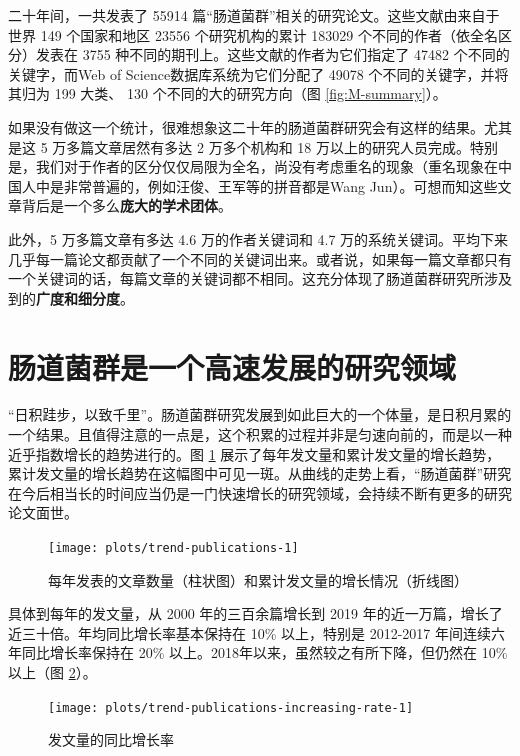 \documentclass[]{ctexbook}
\begin{document}
二十年间，一共发表了 55914 篇``肠道菌群''相关的研究论文。这些文献由来自于世界 149 个国家和地区 23556 个研究机构的累计 183029 个不同的作者（依全名区分）发表在 3755 种不同的期刊上。这些文献的作者为它们指定了 47482 个不同的关键字，而Web of Science数据库系统为它们分配了 49078 个不同的关键字，并将其归为 199 大类、 130 个不同的大的研究方向（图 \ref{fig:M-summary}）。

如果没有做这一个统计，很难想象这二十年的肠道菌群研究会有这样的结果。尤其是这 5 万多篇文章居然有多达 2 万多个机构和 18 万以上的研究人员完成。特别是，我们对于作者的区分仅仅局限为全名，尚没有考虑重名的现象（重名现象在中国人中是非常普遍的，例如汪俊、王军等的拼音都是Wang Jun）。可想而知这些文章背后是一个多么\textbf{庞大的学术团体}。

此外，5 万多篇文章有多达 4.6 万的作者关键词和 4.7 万的系统关键词。平均下来几乎每一篇论文都贡献了一个不同的关键词出来。或者说，如果每一篇文章都只有一个关键词的话，每篇文章的关键词都不相同。这充分体现了肠道菌群研究所涉及到的\textbf{广度和细分度}。

\hypertarget{ux80a0ux9053ux83ccux7fa4ux662fux4e00ux4e2aux9ad8ux901fux53d1ux5c55ux7684ux7814ux7a76ux9886ux57df}{%
\section{肠道菌群是一个高速发展的研究领域}\label{ux80a0ux9053ux83ccux7fa4ux662fux4e00ux4e2aux9ad8ux901fux53d1ux5c55ux7684ux7814ux7a76ux9886ux57df}}

``日积跬步，以致千里''。肠道菌群研究发展到如此巨大的一个体量，是日积月累的一个结果。且值得注意的一点是，这个积累的过程并非是匀速向前的，而是以一种近乎指数增长的趋势进行的。图 \ref{fig:trend-publications} 展示了每年发文量和累计发文量的增长趋势，累计发文量的增长趋势在这幅图中可见一斑。从曲线的走势上看，``肠道菌群''研究在今后相当长的时间应当仍是一门快速增长的研究领域，会持续不断有更多的研究论文面世。

\begin{figure}
\texttt{[image: plots/trend-publications-1]} \caption{每年发表的文章数量（柱状图）和累计发文量的增长情况（折线图）}\label{fig:trend-publications}
\end{figure}

具体到每年的发文量，从 2000 年的三百余篇增长到 2019 年的近一万篇，增长了近三十倍。年均同比增长率基本保持在 10\% 以上，特别是 2012-2017 年间连续六年同比增长率保持在 20\% 以上。2018年以来，虽然较之有所下降，但仍然在 10\% 以上（图 \ref{fig:trend-publications-increasing-rate}）。

\begin{figure}
\texttt{[image: plots/trend-publications-increasing-rate-1]} \caption{发文量的同比增长率}\label{fig:trend-publications-increasing-rate}
\end{figure}
\end{document}
